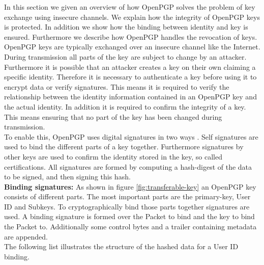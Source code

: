 In this section we given an overview of how OpenPGP solves the problem of key exchange using insecure channels. We explain how the integrity of OpenPGP keys is protected. In addition we show how the binding between identity and key is ensured. Furthermore we describe how OpenPGP handles the revocation of keys. \\

OpenPGP keys are typically exchanged over an insecure channel like the Internet. During transmission all parts of the key are subject to change by an attacker. Furthermore it is possible that an attacker creates a key on their own claiming a specific identity. Therefore it is necessary to authenticate a key before using it to encrypt data or verify signatures.
This means it is required to verify the relationship between the identity information contained in an OpenPGP key and the actual identity. In addition it is required to confirm the integrity of a key. This means ensuring that no part of the key has been changed during transmission. \\

To enable this, OpenPGP uses digital signatures in two ways \cite[section 5.2.4]{RFC4880}. Self signatures are used to bind the different parts of a key together. Furthermore signatures by other keys are used to confirm the identity stored in the key, so called certifications. All signatures are formed by computing a hash-digest of the data to be signed, and then signing this hash. \\

\textbf{Binding signatures:} As shown in figure \ref{fig:transferable-key} an OpenPGP key consists of different parts. The most important parts are the primary-key, User ID  and Subkeys. To cryptographically bind those parts together signatures are used. A binding signature is formed over the Packet to bind and the key to bind the Packet to. Additionally some control bytes and a trailer containing metadata are appended.  \\

The following list illustrates the structure of the hashed data for a User ID binding.

